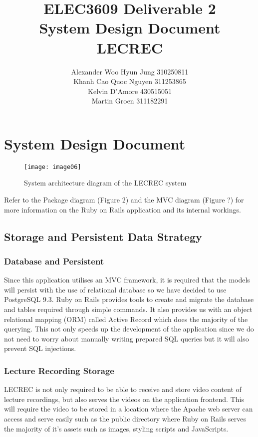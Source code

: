 \documentclass{article}
\title{ELEC3609 Deliverable 2 \\ System Design Document \\[1cm] {\Huge{LECREC}}}
\author{Alexander Woo Hyun Jung  310250811 \\ Khanh Cao Quoc Nguyen 311253865 \\ Kelvin D'Amore 430515051 \\ Martin Groen 311182291}
\date{}
\begin{document}
\maketitle
\thispagestyle{empty}

\newpage
\tableofcontents
\newpage

\section{System Design Document}

\begin{figure}[h!]
\centering
\texttt{[image: image06]}
\caption{System architecture diagram of the LECREC system}
\end{figure}
Refer to the Package diagram (Figure 2) and the MVC diagram (Figure ?) for more information on the Ruby on Rails application and its internal workings.

\subsection{Storage and Persistent Data Strategy}
\subsubsection{Database and Persistent}
Since this application utilises an MVC framework, it is required that the models will persist with the use of relational database so we have decided to use PostgreSQL 9.3. Ruby on Rails provides tools to create and migrate the database and tables required through simple commands. It also provides us with an object relational mapping (ORM) called Active Record which does the majority of the querying. This not only speeds up the development of the application since we do not need to worry about manually writing prepared SQL queries but it will also prevent SQL injections.

\subsubsection{Lecture Recording Storage}
LECREC is not only required to be able to receive and store video content of lecture recordings, but also serves the videos on the application frontend. This will require the video to be stored in a location where the Apache web server can access and serve easily such as the public directory where Ruby on Rails serves the majority of it's assets such as images, styling scripts and JavaScripts. 
\end{document}
